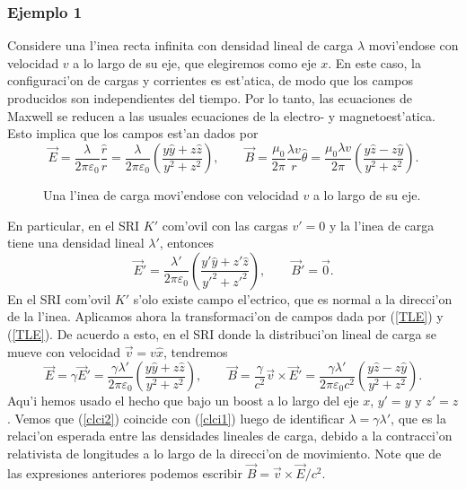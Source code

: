 \subsubsection{Ejemplo 1}
Considere una l'inea recta infinita con densidad lineal de carga $\lambda$ movi'endose con velocidad $v$ a lo largo de su eje, que elegiremos como eje $x$. En este caso, la configuraci'on de cargas y corrientes es est'atica, de modo que los campos producidos son independientes del tiempo. Por lo tanto, las ecuaciones de Maxwell se reducen a las usuales ecuaciones de la electro- y magnetoest'atica. Esto implica que los campos est'an dados por
\begin{equation}
 \vec{E}=\frac{\lambda}{2\pi\varepsilon_0}\frac{\hat{r}}{r}=\frac{\lambda}{2\pi\varepsilon_0}\left( \frac{y\hat{y}+z\hat{z}}{y^2+z^2}\right) , \qquad \vec{B}=\frac{\mu_0}{2\pi}\frac{\lambda v}{r}\hat\theta=\frac{\mu_0\lambda v}{2\pi}\left( \frac{y\hat{z}-z\hat{y}}{y^2+z^2}\right) . \label{clci1}
\end{equation}
\begin{center}
\begin{figure}[H]
\centerline{}
\caption{Una l'inea de carga movi'endose con velocidad $v$ a lo largo de su eje.} \label{fig:bc01}
\end{figure}
\end{center}
En particular, en el SRI $K'$ com'ovil con las cargas $v'=0$ y la l'inea de carga tiene una densidad lineal $\lambda'$, entonces
\begin{equation}
 \vec{E}'=\frac{\lambda'}{2\pi\varepsilon_0}\left( \frac{y'\hat{y}+z'\hat{z}}{y'^2+z'^2}\right) , \qquad \vec{B}'=\vec{0}.
\end{equation}
En el SRI com'ovil $K'$ s'olo existe campo el'ectrico, que es normal a la direcci'on de la l'inea. Aplicamos ahora la transformaci'on de campos dada por (\ref{TLE}) y (\ref{TLE}). De acuerdo a esto, en el SRI donde la distribuci'on lineal de carga se mueve con velocidad $\vec{v}=v\hat{x}$, tendremos
\begin{equation}
 \vec{E}=\gamma\vec{E}'=\frac{\gamma\lambda'}{2\pi\varepsilon_0}\left( \frac{y\hat{y}+z\hat{z}}{y^2+z^2}\right) , \qquad \vec{B}= \frac{\gamma}{c^2}\vec{v}\times\vec{E}'=\frac{\gamma\lambda'}{2\pi\varepsilon_0c^2}\left( \frac{y\hat{z}-z\hat{y}}{y^2+z^2}\right). \label{clci2}
\end{equation}
Aqu'i hemos usado el hecho que bajo un boost a lo largo del eje $x$, $y'=y$ y $z'=z$. Vemos que (\ref{clci2}) coincide con (\ref{clci1}) luego de identificar $\lambda=\gamma\lambda'$, que es la relaci'on esperada entre las densidades lineales de carga, debido a la contracci'on relativista de longitudes a lo largo de la direcci'on de movimiento. Note que de las expresiones anteriores podemos escribir  $\vec{B}=\vec{v}\times\vec{E}/c^2$.

